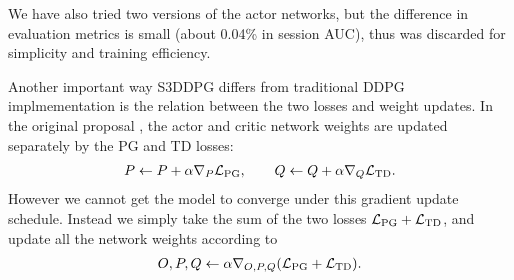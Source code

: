 


We have also tried two versions of the actor networks, but the difference in evaluation metrics is small (about 0.04\% in session AUC), thus was discarded for simplicity and training efficiency.

Another important way S3DDPG differs from traditional DDPG implmementation is the relation between the two losses and weight updates. In the original proposal \cite{lillicrap2015continuous}, the actor and critic network weights are updated separately by the PG and TD losses:
\begin{align*}
    P \leftarrow P + \alpha \nabla_P \mathcal{L}_{\text{PG}}, \qquad Q \leftarrow Q + \alpha \nabla_Q \mathcal{L}_{\text{TD}}.
\end{align*}
However we cannot get the model to converge under this gradient update schedule. Instead we simply take the sum of the two losses $\mathcal{L}_{\text{PG}} + \mathcal{L}_{\text{TD}}$, and update all the network weights according to
\begin{align*}
    O, P, Q \leftarrow \alpha \nabla_{O, P, Q} (\mathcal{L}_{\text{PG}} + \mathcal{L}_{\text{TD}}).
\end{align*}


